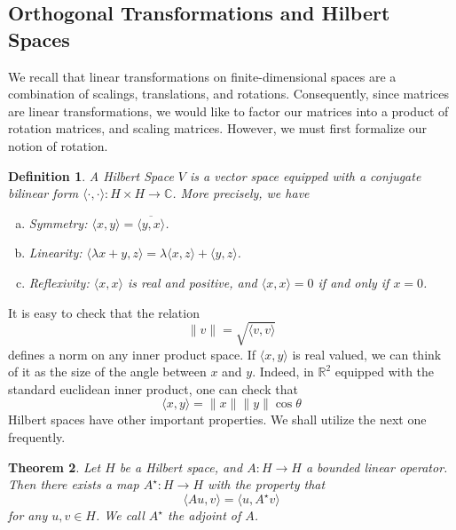 \documentclass[12pt,reqno]{amsart}
\numberwithin{equation}{section}  %
\newcommand{\rr}{\mathbb{R}}
\newcommand{\cc}{\mathbb{C}}
\newtheorem{theorem}{Theorem}[section]
\newtheorem{definition}[theorem]{Definition}
\begin{document}
\subsection{Orthogonal Transformations and Hilbert Spaces}
We recall that linear transformations on finite-dimensional spaces are a combination
of scalings, translations, and rotations. Consequently, since matrices are linear transformations,
we would like to factor our matrices into a product of rotation matrices, and scaling matrices.
However, we must first formalize our notion of rotation. 
\begin{definition}
A Hilbert Space $V$ is a vector space equipped with a conjugate bilinear form 
$ \langle \cdot, \cdot \rangle : H \times H \to \cc $. More precisely, we have
\begin{enumerate}[a)]
\item{Symmetry:} $\langle x,y \rangle  = \overline{ \langle y,x \rangle   }$.
\item{Linearity:} $\langle \lambda x + y, z \rangle  =
\lambda \langle x, z \rangle  + \langle y, z \rangle$.
\item{Reflexivity:} $\langle x, x \rangle  $ is real and positive, 
and $\langle x, x \rangle = 0 $ if and only if $x = 0$.            
\end{enumerate}
\end{definition}
It is easy to check that the relation
\begin{equation*}
\| v \| = \sqrt{\langle v, v \rangle}
\end{equation*}
defines a norm on any inner product space. If $ \langle x, y \rangle $ is real
valued, we can think of it as the size of the angle between $x$
and $y$. Indeed, in $\rr^2$ equipped with the standard euclidean inner product,
one can check that
\begin{equation*}
\langle x, y \rangle  = \|x\| \|y\|\cos \theta
\end{equation*}
Hilbert spaces have other important properties. We shall utilize the next one 
frequently. 

\begin{theorem}
Let $H$ be a Hilbert space, and $A : H \to H$ a bounded linear operator. Then
there exists a map $A^{\star} : H \to H$ with the property that
\begin{equation*}
\langle Au, v \rangle  = \langle u, A^{\star}v \rangle 
\end{equation*}
for any $u, v \in H$. We call $A^{\star}$ the \emph{adjoint} of $A$.
\end{theorem}
\end{document}
